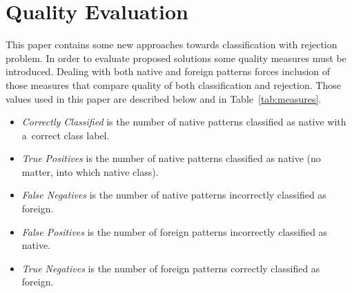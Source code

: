 \chapter{Quality Evaluation} \label{quality_measures}

This paper contains some new approaches towards classification with rejection problem. In order to evaluate proposed solutions some quality measures must be introduced. Dealing with both native and foreign patterns forces inclusion of those measures that compare quality of both classification and rejection. Those values used in this paper are described below and in Table~\ref{tab:measures}.

\begin{itemize}
	\item \emph{Correctly Classified} is the number of native patterns classified as native with a~correct class label.
	\item \emph{True Positives} is the number of native patterns classified as native (no matter, into which native class).
	\item \emph{False Negatives} is the number of native patterns incorrectly classified as foreign.
	\item \emph{False Positives} is the number of foreign patterns incorrectly classified as native.
	\item \emph{True Negatives} is the number of foreign patterns correctly classified as foreign.
\end{itemize}  


